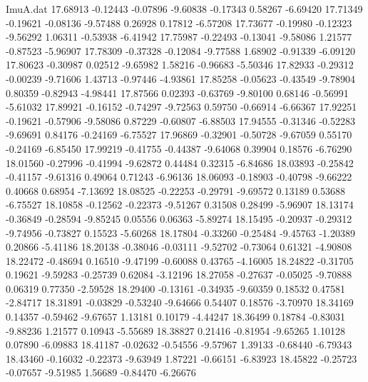 \begin{filecontents}{ImuA.dat}
  17.68913   -0.12443   -0.07896   -9.60838   -0.17343    0.58267   -6.69420
  17.71349   -0.19621   -0.08136   -9.57488    0.26928    0.17812   -6.57208
  17.73677   -0.19980   -0.12323   -9.56292    1.06311   -0.53938   -6.41942
  17.75987   -0.22493   -0.13041   -9.58086    1.21577   -0.87523   -5.96907
  17.78309   -0.37328   -0.12084   -9.77588    1.68902   -0.91339   -6.09120
  17.80623   -0.30987    0.02512   -9.65982    1.58216   -0.96683   -5.50346
  17.82933   -0.29312   -0.00239   -9.71606    1.43713   -0.97446   -4.93861
  17.85258   -0.05623   -0.43549   -9.78904    0.80359   -0.82943   -4.98441
  17.87566    0.02393   -0.63769   -9.80100    0.68146   -0.56991   -5.61032
  17.89921   -0.16152   -0.74297   -9.72563    0.59750   -0.66914   -6.66367
  17.92251   -0.19621   -0.57906   -9.58086    0.87229   -0.60807   -6.88503
  17.94555   -0.31346   -0.52283   -9.69691    0.84176   -0.24169   -6.75527
  17.96869   -0.32901   -0.50728   -9.67059    0.55170   -0.24169   -6.85450
  17.99219   -0.41755   -0.44387   -9.64068    0.39904    0.18576   -6.76290
  18.01560   -0.27996   -0.41994   -9.62872    0.44484    0.32315   -6.84686
  18.03893   -0.25842   -0.41157   -9.61316    0.49064    0.71243   -6.96136
  18.06093   -0.18903   -0.40798   -9.66222    0.40668    0.68954   -7.13692
  18.08525   -0.22253   -0.29791   -9.69572    0.13189    0.53688   -6.75527
  18.10858   -0.12562   -0.22373   -9.51267    0.31508    0.28499   -5.96907
  18.13174   -0.36849   -0.28594   -9.85245    0.05556    0.06363   -5.89274
  18.15495   -0.20937   -0.29312   -9.74956   -0.73827    0.15523   -5.60268
  18.17804   -0.33260   -0.25484   -9.45763   -1.20389    0.20866   -5.41186
  18.20138   -0.38046   -0.03111   -9.52702   -0.73064    0.61321   -4.90808
  18.22472   -0.48694    0.16510   -9.47199   -0.60088    0.43765   -4.16005
  18.24822   -0.31705    0.19621   -9.59283   -0.25739    0.62084   -3.12196
  18.27058   -0.27637   -0.05025   -9.70888    0.06319    0.77350   -2.59528
  18.29400   -0.13161   -0.34935   -9.60359    0.18532    0.47581   -2.84717
  18.31891   -0.03829   -0.53240   -9.64666    0.54407    0.18576   -3.70970
  18.34169    0.14357   -0.59462   -9.67657    1.13181    0.10179   -4.44247
  18.36499    0.18784   -0.83031   -9.88236    1.21577    0.10943   -5.55689
  18.38827    0.21416   -0.81954   -9.65265    1.10128    0.07890   -6.09883
  18.41187   -0.02632   -0.54556   -9.57967    1.39133   -0.68440   -6.79343
  18.43460   -0.16032   -0.22373   -9.63949    1.87221   -0.66151   -6.83923
  18.45822   -0.25723   -0.07657   -9.51985    1.56689   -0.84470   -6.26676

\end{filecontents}
